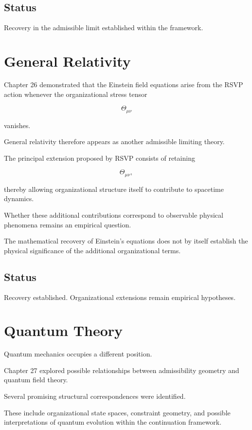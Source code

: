 \documentclass[11pt,oneside]{book}
\numberwithin{equation}{chapter}
\theoremstyle{definition}
\theoremstyle{plain}
\begin{document}
\subsection*{Status}

Recovery in the admissible limit established within the framework.

\section{General Relativity}

Chapter 26 demonstrated that the Einstein field equations arise from the
RSVP action whenever the organizational stress tensor

\[
\Theta_{\mu\nu}
\]

vanishes.

General relativity therefore appears as another admissible limiting theory.

The principal extension proposed by RSVP consists of retaining

\[
\Theta_{\mu\nu},
\]

thereby allowing organizational structure itself to contribute to
spacetime dynamics.

Whether these additional contributions correspond to observable physical
phenomena remains an empirical question.

The mathematical recovery of Einstein's equations does not by itself
establish the physical significance of the additional organizational
terms.

\subsection*{Status}

Recovery established. Organizational extensions remain empirical
hypotheses.

\section{Quantum Theory}

Quantum mechanics occupies a different position.

Chapter 27 explored possible relationships between admissibility geometry
and quantum field theory.

Several promising structural correspondences were identified.

These include organizational state spaces, constraint geometry, and
possible interpretations of quantum evolution within the continuation
framework.
\end{document}
